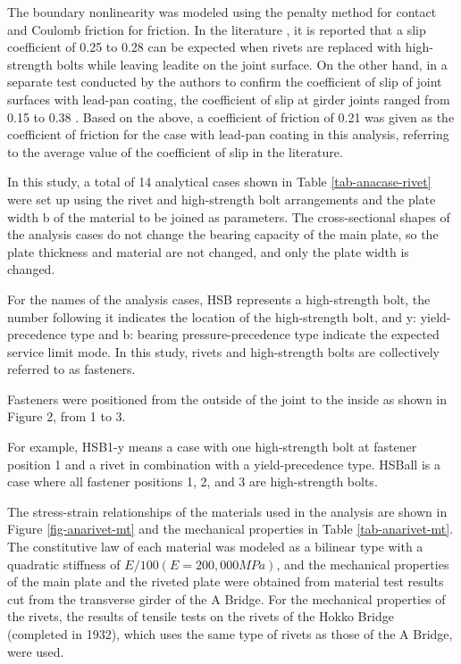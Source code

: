 The boundary nonlinearity was modeled using the penalty method for contact and Coulomb friction for friction. In the literature \cite{rtri1992Manual}, it is reported that a slip coefficient of 0.25 to 0.28 can be expected when rivets are replaced with high-strength bolts while leaving leadite on the joint surface. On the other hand, in a separate test conducted by the authors to confirm the coefficient of slip of joint surfaces with lead-pan coating, the coefficient of slip at girder joints ranged from 0.15 to 0.38 \cite{Chen2021}. Based on the above, a coefficient of friction of 0.21 was given as the coefficient of friction for the case with lead-pan coating in this analysis, referring to the average value of the coefficient of slip in the literature.

In this study, a total of 14 analytical cases shown in Table \ref{tab-anacase-rivet} were set up using the rivet and high-strength bolt arrangements and the plate width b of the material to be joined as parameters. The cross-sectional shapes of the analysis cases do not change the bearing capacity of the main plate, so the plate thickness and material are not changed, and only the plate width is changed.

For the names of the analysis cases, HSB represents a high-strength bolt, the number following it indicates the location of the high-strength bolt, and y: yield-precedence type and b: bearing pressure-precedence type indicate the expected service limit mode. In this study, rivets and high-strength bolts are collectively referred to as fasteners.

Fasteners were positioned from the outside of the joint to the inside as shown in Figure 2, from 1 to 3.

For example, HSB1-y means a case with one high-strength bolt at fastener position 1 and a rivet in combination with a yield-precedence type. HSBall is a case where all fastener positions 1, 2, and 3 are high-strength bolts.

The stress-strain relationships of the materials used in the analysis are shown in Figure \ref{fig-anarivet-mt} and the mechanical properties in Table \ref{tab-anarivet-mt}. The constitutive law of each material was modeled as a bilinear type with a quadratic stiffness of $E/100 (E=200,000 MPa)$, and the mechanical properties of the main plate and the riveted plate were obtained from material test results cut from the transverse girder of the A Bridge. For the mechanical properties of the rivets, the results of tensile tests \cite{KOMATSU2015} on the rivets of the Hokko Bridge (completed in 1932), which uses the same type of rivets as those of the A Bridge, were used.


